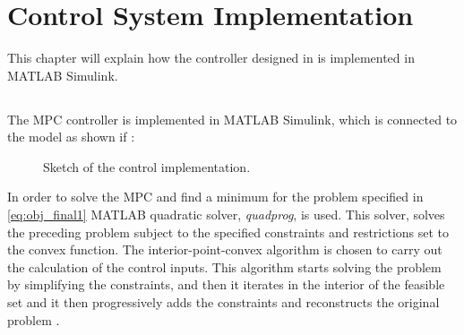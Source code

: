 \chapter{Control System Implementation}
\label{implementation_of_controller}

This chapter will explain how the controller designed in  is implemented in MATLAB Simulink.

\section{}
The MPC controller is implemented in MATLAB Simulink, which is connected to the model as shown if :
\begin{figure}[H]
\centering
 
\caption{Sketch of the control implementation.}
\label{fig:control_sketch}
\end{figure}

In order to solve the MPC and find a minimum for the problem specified in \eqref{eq:obj_final1} MATLAB quadratic solver, \textit{quadprog}, is used. This solver, solves the preceding problem subject to the specified constraints and restrictions set to the convex function. The interior-point-convex algorithm is chosen to carry out the calculation of the control inputs. This algorithm starts solving the problem by simplifying the constraints, and then it iterates in the interior of the feasible set and it then progressively adds the constraints and reconstructs the original problem \cite{Convex_optimization}. 